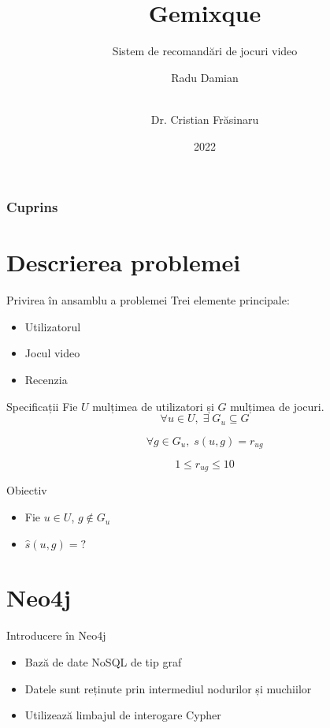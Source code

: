 \documentclass{beamer}
\title[Gemixque - sistem de recomandări de jocuri video]{Gemixque}
\subtitle{Sistem de recomandări de jocuri video}
\author[Radu Damian]{Radu Damian \and \\[9mm] Dr. Cristian Frăsinaru}
\institute{Facultatea de Informatică}
\date{2022}
\begin{document}
\frame{\titlepage}


\begin{frame}
  \frametitle{Cuprins}
  \tableofcontents
\end{frame}

\section{Descrierea problemei}
\frame{\tableofcontents[currentsection]}

\begin{frame}{Privirea în ansamblu a problemei}
   Trei elemente principale:
   \begin{itemize}
  \item Utilizatorul
  \item Jocul video
  \item Recenzia
  \end{itemize}
\end{frame}

\begin{frame}{Specificații}
    Fie  \(U \)  mulțimea de utilizatori și \( G \) mulțimea de  jocuri. 
     \[ \forall  u  \in  U,  \;  \exists \; G_u \subseteq  G  \] 
     
     \[ \forall g \in G_u, \; s(u, g) = r_{ug}\]
     
     \[ 1 \leq r_{ug} \leq 10\]
     
    
    
\end{frame}

\begin{frame}{Obiectiv}
\begin{itemize}
  \item Fie \( u \in U \), \(g \notin G_u \) 
  \item \( \hat{s}(u, g) = ?\)
  \end{itemize}
\end{frame}

\section{Neo4j}
\frame{\tableofcontents[currentsection]}
\begin{frame}{Introducere în Neo4j}
    \begin{itemize}
        \item Bază de date NoSQL de tip graf
        \item Datele sunt reținute prin intermediul nodurilor și muchiilor
        \item Utilizează limbajul de interogare Cypher
    \end{itemize}
\end{frame}
\end{document}
